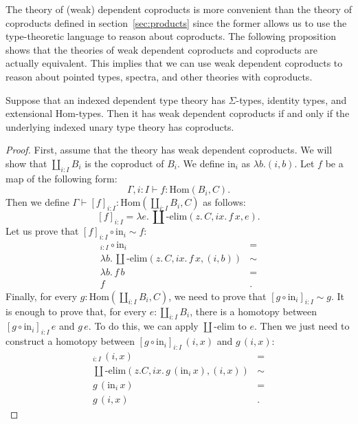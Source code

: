 \documentclass[reqno]{mscs}
\newcommand{\fs}[1]{\mathrm{#1}}
\newcommand{\Hom}{\fs{Hom}}
\numberwithin{figure}{section}
\begin{document}
The theory of (weak) dependent coproducts is more convenient than the theory of coproducts defined in section~\ref{sec:products} since the former allows us to use the type-theoretic language to reason about coproducts.
The following proposition shows that the theories of weak dependent coproducts and coproducts are actually equivalent.
This implies that we can use weak dependent coproducts to reason about pointed types, spectra, and other theories with coproducts.

\begin{prop}
Suppose that an indexed dependent type theory has $\Sigma$-types, identity types, and extensional $\Hom$-types.
Then it has weak dependent coproducts if and only if the underlying indexed unary type theory has coproducts.
\end{prop}
\begin{proof}
First, assume that the theory has weak dependent coproducts.
We will show that $\coprod_{i : I} B_i$ is the coproduct of $B_i$.
We define $\fs{in}_i$ as $\lambda b.(i,b)$.
Let $f$ be a map of the following form:
\[ \Gamma, i : I \vdash f : \Hom(B_i,C). \]
Then we define $\Gamma \vdash [f]_{i : I} : \Hom(\coprod_{i : I} B_i, C)$ as follows:
\[ [f]_{i : I} = \lambda e.\,\coprod\text{-}\fs{elim}(z.\,C, i x.\,f\,x, e). \]
Let us prove that $[f]_{i : I} \circ \fs{in}_i \sim f$:
\begin{align*}
[f]_{i : I} \circ \fs{in}_i & = \\
\lambda b.\,\coprod\text{-}\fs{elim}(z.\,C, i x.\,f\,x, (i,b)) & \sim \\
\lambda b.\,f\,b & = \\
f & .
\end{align*}
Finally, for every $g : \Hom(\coprod_{i : I} B_i, C)$, we need to prove that $[g \circ \fs{in}_i]_{i : I} \sim g$.
It is enough to prove that, for every $e : \coprod_{i : I} B_i$, there is a homotopy between $[g \circ \fs{in}_i]_{i : I}\,e$ and $g\,e$.
To do this, we can apply $\coprod\text{-}\fs{elim}$ to $e$.
Then we just need to construct a homotopy between $[g \circ \fs{in}_i]_{i : I}\,(i,x)$ and $g\,(i,x)$:
\begin{align*}
[g \circ \fs{in}_i]_{i : I}\,(i,x) & = \\
\coprod\text{-}\fs{elim}(z.C, i x.\,g\,(\fs{in}_i\,x), (i,x)) & \sim \\
g\,(\fs{in}_i\,x) & = \\
g\,(i,x) & .
\end{align*}


\end{proof}
\end{document}
